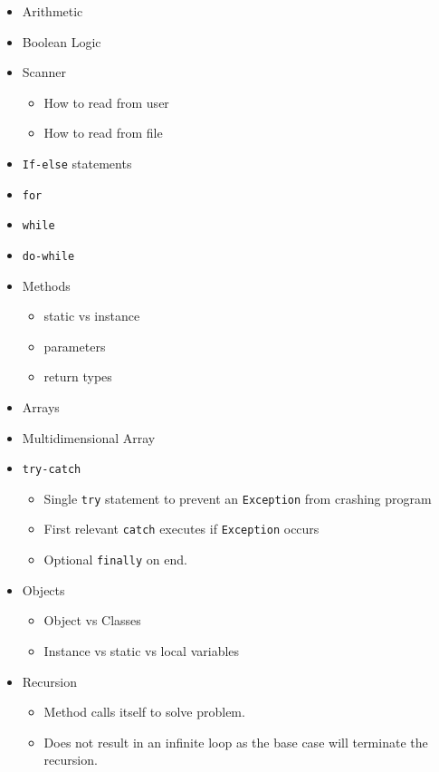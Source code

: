 \documentclass[]{article}
\begin{document}
\begin{itemize}
\begin{itemize}
\begin{itemize}
		\end{itemize}
	\end{itemize}
	\item Arithmetic
	\item Boolean Logic
	\item Scanner
	\begin{itemize}
		\item How to read from user
		\item How to read from file
	\end{itemize}
	\item \texttt{If-else} statements
	\item \texttt{for}
	\item \texttt{while}
	\item \texttt{do-while}
	\item Methods
	\begin{itemize}
		\item static vs instance
		\item parameters
		\item return types
	\end{itemize}
	\item Arrays
	\item Multidimensional Array
	\item \texttt{try-catch}
	\begin{itemize}
		\item Single \texttt{try} statement to prevent an \texttt{Exception} from crashing program
		\item First relevant \texttt{catch} executes if \texttt{Exception} occurs
		\item Optional \texttt{finally} on end.
	\end{itemize}
	\item Objects
	\begin{itemize}
		\item Object vs Classes
		\item Instance vs static vs local variables
	\end{itemize}
	\item Recursion
	\begin{itemize}
		\item Method calls itself to solve problem.
		\item Does not result in an infinite loop as the base case will terminate the recursion.
	\end{itemize} 
\end{itemize}
\end{document}
